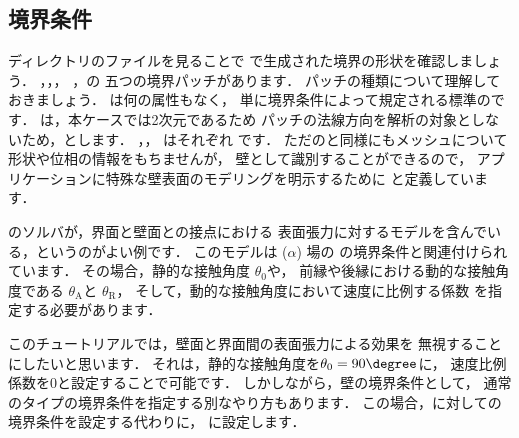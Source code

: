 \subsection{境界条件}
\label{ssec:2.3.2}
ディレクトリのファイルを見ることで
で生成された境界の形状を確認しましょう．
，，，
，の
五つの境界パッチがあります．
パッチの種類について理解しておきましょう．
は何の属性もなく，
単に境界条件によって規定される標準のです．
は，本ケースでは2次元であるため
パッチの法線方向を解析の対象としないため，とします．
，，
はそれぞれ
%
%
です．
ただのと同様にもメッシュについて形状や位相の情報をもちませんが，
壁として識別することができるので，
アプリケーションに特殊な壁表面のモデリングを明示するために
と定義しています．

のソルバが，界面と壁面との接点における
表面張力に対するモデルを含んでいる，というのがよい例です．
このモデルは ($\alpha$) 場の
%
%
の境界条件と関連付けられています．
その場合，静的な接触角度 $\theta_{0}$や，
前縁や後縁における動的な接触角度である
 $\theta_{\mathrm{A}}$と $\theta_{\mathrm{R}}$，
そして，動的な接触角度において速度に比例する係数
を指定する必要があります．

このチュートリアルでは，壁面と界面間の表面張力による効果を
無視することにしたいと思います．
それは，静的な接触角度を$\theta_{0} = 90\degree$に，
速度比例係数を$0$と設定することで可能です．
しかしながら，壁の境界条件として，
通常のタイプの境界条件を指定する別なやり方もあります．
この場合，に対しての境界条件を設定する代わりに，
に設定します．

